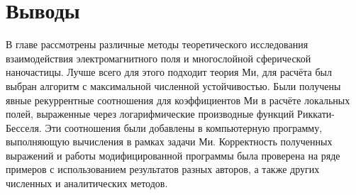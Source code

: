\section{Выводы}

В главе рассмотрены различные методы теоретического исследования
взаимодействия электромагнитного поля и многослойной сферической
наночастицы. Лучше всего для этого подходит теория Ми, для расчёта был
выбран алгоритм с максимальной численной устойчивостью.  Были получены
явные рекуррентные соотношения для коэффициентов Ми в расчёте
локальных полей, выраженные через логарифмические производные функций
Риккати-Бесселя.  Эти соотношения были добавлены в компьютерную
программу, выполняющую вычисления в рамках задачи Ми. Корректность
полученных выражений и работы модифицированной программы была
проверена на ряде примеров с использованием результатов разных
авторов, а также других численных и аналитических методов.




\clearpage